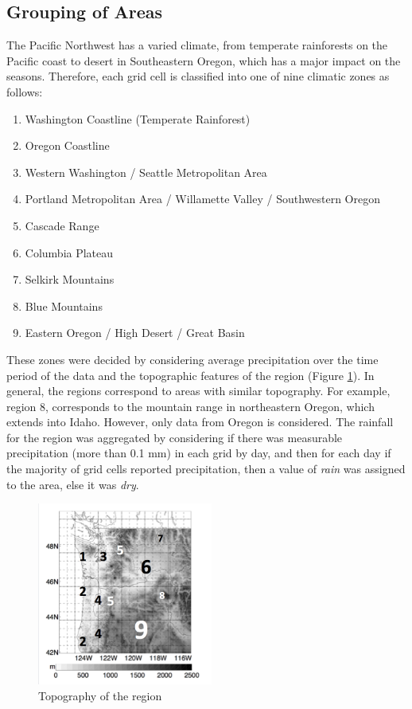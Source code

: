 \documentclass{article}
\begin{document}
\subsection{Grouping of Areas} \label{GroupArea}
The Pacific Northwest has a varied climate, from temperate rainforests on the Pacific coast to desert in Southeastern Oregon, which has a major impact on the seasons. Therefore, each grid cell is classified into one of nine climatic zones as follows:
\begin{enumerate}
\item Washington Coastline (Temperate Rainforest)
\item Oregon Coastline
\item Western Washington / Seattle Metropolitan Area
\item Portland Metropolitan Area / Willamette Valley / Southwestern Oregon
\item Cascade Range
\item Columbia Plateau
\item Selkirk Mountains
\item Blue Mountains
\item Eastern Oregon / High Desert / Great Basin
\end{enumerate}

These zones were decided by considering average precipitation over the time period of the data and the topographic features of the region (Figure \ref{fig:topo}). In general, the regions correspond to areas with similar topography. For example, region 8, corresponds to the mountain range in northeastern Oregon, which extends into Idaho. However, only data from Oregon is considered. The rainfall for the region was aggregated by considering if there was measurable precipitation (more than 0.1 mm) in each grid by day, and then for each day if the majority of grid cells reported precipitation, then a value of \textit{rain} was assigned to the area, else it was \textit{dry}.


\begin{figure}[h!]
\centering
\includegraphics[width = .4\textwidth, height = 6cm]{LabledTopography}
\caption{Topography of the region }
\label{fig:topo}
\end{figure}
\end{document}
